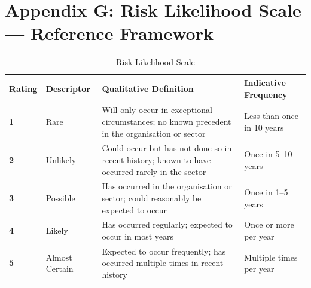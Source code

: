 \chapter*{Appendix G: Risk Likelihood Scale — Reference Framework}
\label{chap:Appendix G: Risk Likelihood Scale — Reference Framework}

\begin{table}[H]
  \centering
  \renewcommand{\arraystretch}{1.5}
  \begin{tabularx}{\textwidth}{ | >{\raggedright\arraybackslash}p{} 
								| >{\raggedright\arraybackslash}p{} 
								| >{\raggedright\arraybackslash}p{} 
                                | >{\raggedright\arraybackslash}X | }
    \hline
    \textbf{Rating} & \textbf{Descriptor} & \textbf{Qualitative Definition} & \textbf{Indicative Frequency} \\
    \hline
    \textbf{1} & Rare & Will only occur in exceptional circumstances; no known precedent in the organisation or sector & Less than once in 10 years\\
    \hline
    \textbf{2} & Unlikely & Could occur but has not done so in recent history; known to have occurred rarely in the sector & Once in 5–10 years\\
    \hline
    \textbf{3} & Possible & Has occurred in the organisation or sector; could reasonably be expected to occur & Once in 1–5 years\\
    \hline
    \textbf{4} & Likely & Has occurred regularly; expected to occur in most years & Once or more per year\\
    \hline
    \textbf{5} & Almost Certain & Expected to occur frequently; has occurred multiple times in recent history & Multiple times per year\\
    \hline
  \end{tabularx}
  \caption{Risk Likelihood Scale}
\end{table}

